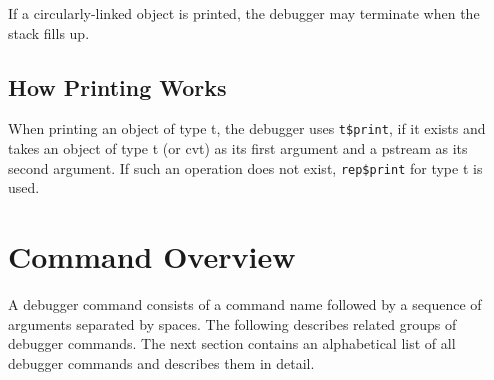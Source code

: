 If a circularly-linked object is printed, the debugger may terminate
when the stack fills up.

\subsection{How Printing Works}

When printing an object of type t, the debugger uses {\tt t\$print},
if it exists and takes an object of type t (or cvt) as its first
argument and a pstream as its second argument.  If such an operation
does not exist, {\tt rep\$print} for type t is used.

\section{Command Overview}

A debugger command consists of a command name followed by a sequence
of arguments separated by spaces.  The following describes related
groups of debugger commands.  The next section contains an
alphabetical list of all debugger commands and describes them in
detail.

